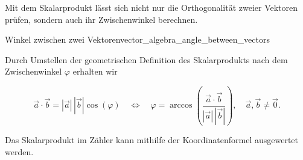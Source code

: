Mit dem Skalarprodukt lässt sich nicht nur die Orthogonalität zweier Vektoren
prüfen, sondern auch ihr Zwischenwinkel berechnen.

\begin{KeyPointBox}{Winkel zwischen zwei Vektoren}{vector_algebra_angle_between_vectors}
  
    Durch Umstellen der geometrischen Definition des Skalarprodukts nach dem
    Zwischenwinkel $\varphi$ erhalten wir
    \par\smallskip\noindent
    \begin{minipage}[c]{0.72\linewidth}
      \[
        \vec a\cdot\vec b=|\vec a|\,|\vec b|\cos(\varphi)
        \quad \Longleftrightarrow \quad
        \varphi=\arccos\!\left(
          \frac{\vec a\cdot\vec b}{|\vec a|\,|\vec b|}
        \right),
        \quad \vec a,\vec b\ne\vec 0.
      \]
  \end{minipage}\hfill
  \begin{minipage}[c]{0.25\linewidth}
    \centering
  \end{minipage}
  \par\smallskip
  Das Skalarprodukt im Zähler kann mithilfe der Koordinatenformel
  ausgewertet werden.
\end{KeyPointBox}

